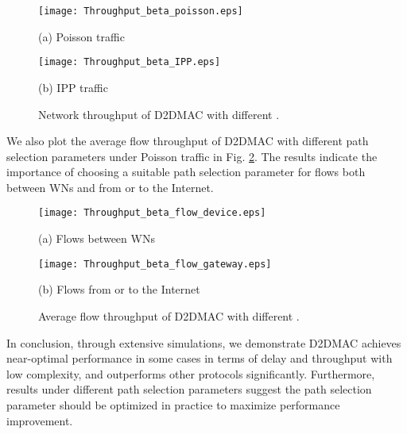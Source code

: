 \documentclass[journal]{IEEEtran}
\begin{document}
\begin{figure}[htbp]
\begin{minipage}[t]{0.5\linewidth}
\centering
\texttt{[image: Throughput\_beta\_poisson.eps]}
\centerline{\small (a) Poisson traffic}
\end{minipage}\begin{minipage}[t]{0.5\linewidth}
\centering
\texttt{[image: Throughput\_beta\_IPP.eps]}
\centerline{\small (b) IPP traffic}
\end{minipage}\caption{Network throughput of D2DMAC with different .}
\label{fig:Throughput_beta} \vspace*{-3mm}
\end{figure}


We also plot the average flow throughput of D2DMAC with different path selection parameters under
Poisson traffic in Fig. \ref{fig:Throughput_beta_poisson_flow}. The results indicate the importance
of choosing a suitable path selection parameter for flows both between WNs and from or to the
Internet.



\begin{figure}[htbp]
\begin{minipage}[t]{0.5\linewidth}
\centering
\texttt{[image: Throughput\_beta\_flow\_device.eps]}
\centerline{\small (a) Flows between WNs}
\end{minipage}\begin{minipage}[t]{0.5\linewidth}
\centering
\texttt{[image: Throughput\_beta\_flow\_gateway.eps]}
\centerline{\small (b) Flows from or to the Internet}
\end{minipage}\caption{Average flow throughput of D2DMAC with different .}
\label{fig:Throughput_beta_poisson_flow} \vspace*{-3mm}
\end{figure}


In conclusion, through extensive simulations, we demonstrate D2DMAC achieves near-optimal
performance in some cases in terms of delay and throughput with low complexity, and outperforms other protocols
significantly. Furthermore, results under different path selection parameters suggest the path
selection parameter should be optimized in practice to maximize performance improvement.
\end{document}
